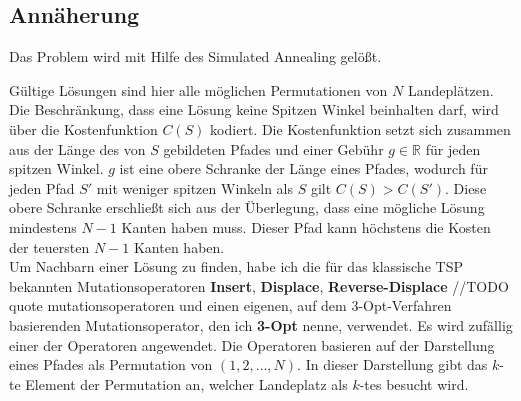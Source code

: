 \documentclass[a4paper,10pt,ngerman]{scrartcl}
\begin{document}
\subsection{Annäherung}
Das Problem wird mit Hilfe des Simulated Annealing \cite{kirkpatrick_1983} gelößt.
\begin{algorithmic}
  \EndIf
  \EndIf
  \EndFor

  \EndProcedure
\end{algorithmic}
Gültige Lösungen sind hier alle möglichen Permutationen von $N$ Landeplätzen. Die Beschränkung, dass eine
Lösung keine Spitzen Winkel beinhalten darf, wird über die Kostenfunktion $C(S)$ kodiert. Die Kostenfunktion
setzt sich zusammen aus der Länge des von $S$ gebildeten Pfades und einer Gebühr $g \in \mathbb{R}$ für jeden spitzen Winkel. $g$
ist eine obere Schranke der Länge eines Pfades, wodurch für jeden Pfad $S'$ mit weniger spitzen Winkeln als $S$
gilt $C(S) > C(S')$. Diese obere Schranke erschließt sich aus der Überlegung, dass eine mögliche Lösung mindestens $N-1$ Kanten haben muss.
Dieser Pfad kann höchstens die Kosten der teuersten $N-1$ Kanten haben. \\
Um Nachbarn einer Lösung zu finden, habe ich die für das klassische TSP bekannten Mutationsoperatoren \textbf{Insert}, \textbf{Displace}, \textbf{Reverse-Displace}
//TODO quote mutationsoperatoren
und einen eigenen, auf dem 3-Opt-Verfahren basierenden Mutationsoperator, den ich \textbf{3-Opt} nenne, verwendet. Es wird zufällig einer der Operatoren angewendet.
Die Operatoren basieren auf der
Darstellung eines Pfades als Permutation von $(1, 2, \ldots, N)$. In dieser Darstellung gibt das $k$-te Element der Permutation
an, welcher Landeplatz als $k$-tes besucht wird.
\end{document}
